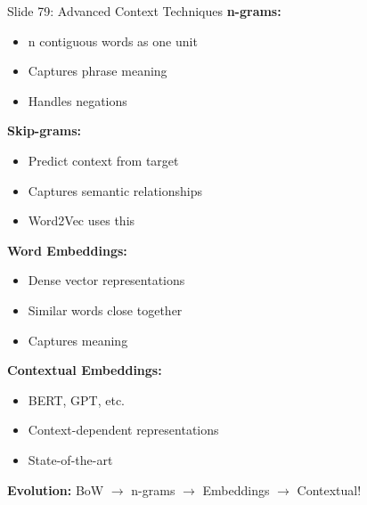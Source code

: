 \documentclass[8pt]{beamer}
\begin{document}
	\begin{frame}{Slide 79: Advanced Context Techniques}
		\fontsize{6.5}{7.5}\selectfont
		\textbf{n-grams:}
		\begin{itemize}
			\item n contiguous words as one unit
			\item Captures phrase meaning
			\item Handles negations
		\end{itemize}
		
		\vspace{0.1cm}
		\textbf{Skip-grams:}
		\begin{itemize}
			\item Predict context from target
			\item Captures semantic relationships
			\item Word2Vec uses this
		\end{itemize}
		
		\vspace{0.1cm}
		\textbf{Word Embeddings:}
		\begin{itemize}
			\item Dense vector representations
			\item Similar words close together
			\item Captures meaning
		\end{itemize}
		
		\vspace{0.1cm}
		\textbf{Contextual Embeddings:}
		\begin{itemize}
			\item BERT, GPT, etc.
			\item Context-dependent representations
			\item State-of-the-art
		\end{itemize}
		
		\textcolor{myblue}{\textbf{Evolution:}} BoW $\to$ n-grams $\to$ Embeddings $\to$ Contextual!
	\end{frame}
	
\end{document}
